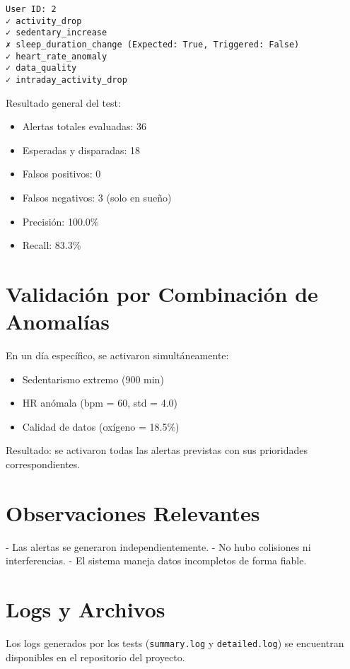 \begin{verbatim}
User ID: 2
✓ activity_drop
✓ sedentary_increase
✗ sleep_duration_change (Expected: True, Triggered: False)
✓ heart_rate_anomaly
✓ data_quality
✓ intraday_activity_drop
\end{verbatim}

\noindent Resultado general del test:

\begin{itemize}
    \item Alertas totales evaluadas: 36
    \item Esperadas y disparadas: 18
    \item Falsos positivos: 0
    \item Falsos negativos: 3 (solo en sueño)
    \item Precisión: 100.0\%
    \item Recall: 83.3\%
\end{itemize}

\section{Validación por Combinación de Anomalías}
\label{anexo:pruebas:combinadas}

En un día específico, se activaron simultáneamente:

\begin{itemize}
    \item Sedentarismo extremo (900 min)
    \item HR anómala (bpm = 60, std = 4.0)
    \item Calidad de datos (oxígeno = 18.5\%)
\end{itemize}

\noindent Resultado: se activaron todas las alertas previstas con sus prioridades correspondientes.

\section{Observaciones Relevantes}
\label{anexo:pruebas:observaciones}

- Las alertas se generaron independientemente.
- No hubo colisiones ni interferencias.
- El sistema maneja datos incompletos de forma fiable.

\section{Logs y Archivos}
\label{anexo:pruebas:logs}

Los logs generados por los tests (\texttt{summary.log} y \texttt{detailed.log}) se encuentran disponibles en el repositorio del proyecto.